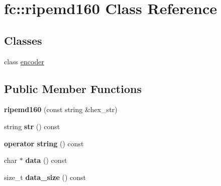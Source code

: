 \hypertarget{classfc_1_1ripemd160}{}\section{fc\+:\+:ripemd160 Class Reference}
\label{classfc_1_1ripemd160}
\subsection*{Classes}
\begin{DoxyCompactItemize}
\item 
class \mbox{\hyperlink{classfc_1_1ripemd160_1_1encoder}{encoder}}
\end{DoxyCompactItemize}
\subsection*{Public Member Functions}
\begin{DoxyCompactItemize}
\item 
\mbox{\label{classfc_1_1ripemd160_a9a50c30c2453a35ea8f69568deff0e1d}} 
{\bfseries ripemd160} (const string \&hex\+\_\+str)
\item 
\mbox{\label{classfc_1_1ripemd160_a29a1cf31cf487f8e18447ecde6fef5ca}} 
string {\bfseries str} () const
\item 
\mbox{\label{classfc_1_1ripemd160_a49a10ca063f02f4302a5e2a8fc1a8a22}} 
{\bfseries operator string} () const
\item 
\mbox{\label{classfc_1_1ripemd160_a774d4a3de0048d37778673674b2fd586}} 
char $\ast$ {\bfseries data} () const
\item 
\mbox{\label{classfc_1_1ripemd160_a87a0af76c90caff452e3a97414dd09ac}} 
size\+\_\+t {\bfseries data\+\_\+size} () const
\end{DoxyCompactItemize}
